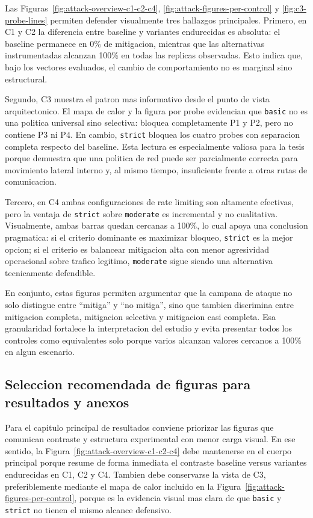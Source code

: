 Las Figuras~\ref{fig:attack-overview-c1-c2-c4}, \ref{fig:attack-figures-per-control} y \ref{fig:c3-probe-lines} permiten defender visualmente tres hallazgos principales. Primero, en C1 y C2 la diferencia entre baseline y variantes endurecidas es absoluta: el baseline permanece en 0\% de mitigacion, mientras que las alternativas instrumentadas alcanzan 100\% en todas las replicas observadas. Esto indica que, bajo los vectores evaluados, el cambio de comportamiento no es marginal sino estructural.

Segundo, C3 muestra el patron mas informativo desde el punto de vista arquitectonico. El mapa de calor y la figura por probe evidencian que \texttt{basic} no es una politica universal sino selectiva: bloquea completamente P1 y P2, pero no contiene P3 ni P4. En cambio, \texttt{strict} bloquea los cuatro probes con separacion completa respecto del baseline. Esta lectura es especialmente valiosa para la tesis porque demuestra que una politica de red puede ser parcialmente correcta para movimiento lateral interno y, al mismo tiempo, insuficiente frente a otras rutas de comunicacion.

Tercero, en C4 ambas configuraciones de rate limiting son altamente efectivas, pero la ventaja de \texttt{strict} sobre \texttt{moderate} es incremental y no cualitativa. Visualmente, ambas barras quedan cercanas a 100\%, lo cual apoya una conclusion pragmatica: si el criterio dominante es maximizar bloqueo, \texttt{strict} es la mejor opcion; si el criterio es balancear mitigacion alta con menor agresividad operacional sobre trafico legitimo, \texttt{moderate} sigue siendo una alternativa tecnicamente defendible.

En conjunto, estas figuras permiten argumentar que la campana de ataque no solo distingue entre ``mitiga'' y ``no mitiga'', sino que tambien discrimina entre mitigacion completa, mitigacion selectiva y mitigacion casi completa. Esa granularidad fortalece la interpretacion del estudio y evita presentar todos los controles como equivalentes solo porque varios alcanzan valores cercanos a 100\% en algun escenario.

\subsection{Seleccion recomendada de figuras para resultados y anexos}

Para el capitulo principal de resultados conviene priorizar las figuras que comunican contraste y estructura experimental con menor carga visual. En ese sentido, la Figura~\ref{fig:attack-overview-c1-c2-c4} debe mantenerse en el cuerpo principal porque resume de forma inmediata el contraste baseline versus variantes endurecidas en C1, C2 y C4. Tambien debe conservarse la vista de C3, preferiblemente mediante el mapa de calor incluido en la Figura~\ref{fig:attack-figures-per-control}, porque es la evidencia visual mas clara de que \texttt{basic} y \texttt{strict} no tienen el mismo alcance defensivo.

